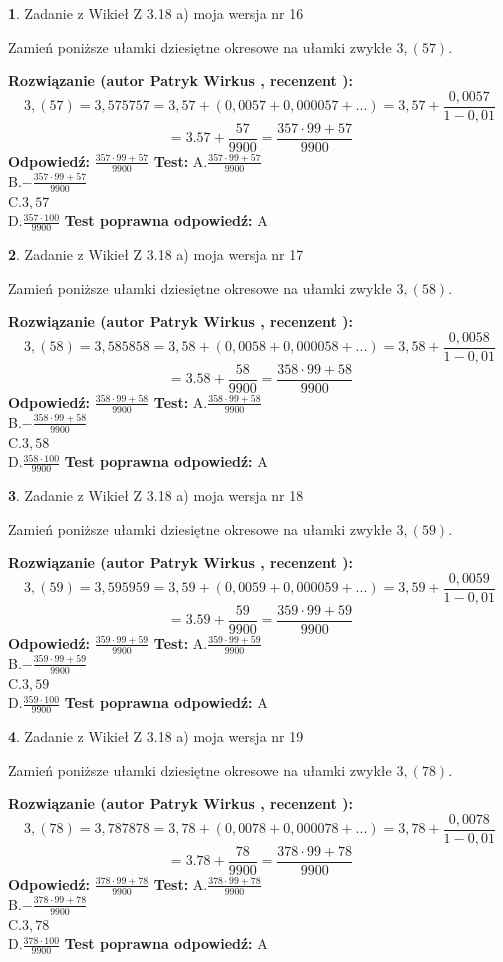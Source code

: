 \documentclass[12pt, a4paper]{article}
\theoremstyle{definition} %
\newtheorem{zad}{}
\newcommand{\zadStart}[1]{\begin{zad}#1\newline}
\newcommand{\zadStop}{\end{zad}}
\newcommand{\rozwStart}[2]{\noindent \textbf{Rozwiązanie (autor #1 , recenzent #2): }\newline}
\newcommand{\rozwStop}{\newline}
\newcommand{\odpStart}{\noindent \textbf{Odpowiedź:}\newline}
\newcommand{\odpStop}{\newline}
\newcommand{\testStart}{\noindent \textbf{Test:}\newline}
\newcommand{\testStop}{\newline}
\newcommand{\kluczStart}{\noindent \textbf{Test poprawna odpowiedź:}\newline}
\newcommand{\kluczStop}{\newline}
\begin{document}
\zadStart{Zadanie z Wikieł Z 3.18 a) moja wersja nr 16}

Zamień poniższe ułamki dziesiętne okresowe na ułamki zwykłe $3,(57)$.
\zadStop
\rozwStart{Patryk Wirkus}{}
$$3,(57)=3,575757=3,57+(0,0057+0,000057+...)=3,57+\frac{0,0057}{1-0,01}$$
$$=3.57+\frac{57}{9900}=\frac{357\cdot99+57}{9900}$$
\rozwStop
\odpStart
$\frac{357\cdot99+57}{9900}$
\odpStop
\testStart
A.$\frac{357\cdot99+57}{9900}$\\ B.$-\frac{357\cdot99+57}{9900}$\\ C.$3,57$\\ D.$\frac{357\cdot100}{9900}$
\testStop
\kluczStart
A
\kluczStop



\zadStart{Zadanie z Wikieł Z 3.18 a) moja wersja nr 17}

Zamień poniższe ułamki dziesiętne okresowe na ułamki zwykłe $3,(58)$.
\zadStop
\rozwStart{Patryk Wirkus}{}
$$3,(58)=3,585858=3,58+(0,0058+0,000058+...)=3,58+\frac{0,0058}{1-0,01}$$
$$=3.58+\frac{58}{9900}=\frac{358\cdot99+58}{9900}$$
\rozwStop
\odpStart
$\frac{358\cdot99+58}{9900}$
\odpStop
\testStart
A.$\frac{358\cdot99+58}{9900}$\\ B.$-\frac{358\cdot99+58}{9900}$\\ C.$3,58$\\ D.$\frac{358\cdot100}{9900}$
\testStop
\kluczStart
A
\kluczStop



\zadStart{Zadanie z Wikieł Z 3.18 a) moja wersja nr 18}

Zamień poniższe ułamki dziesiętne okresowe na ułamki zwykłe $3,(59)$.
\zadStop
\rozwStart{Patryk Wirkus}{}
$$3,(59)=3,595959=3,59+(0,0059+0,000059+...)=3,59+\frac{0,0059}{1-0,01}$$
$$=3.59+\frac{59}{9900}=\frac{359\cdot99+59}{9900}$$
\rozwStop
\odpStart
$\frac{359\cdot99+59}{9900}$
\odpStop
\testStart
A.$\frac{359\cdot99+59}{9900}$\\ B.$-\frac{359\cdot99+59}{9900}$\\ C.$3,59$\\ D.$\frac{359\cdot100}{9900}$
\testStop
\kluczStart
A
\kluczStop



\zadStart{Zadanie z Wikieł Z 3.18 a) moja wersja nr 19}

Zamień poniższe ułamki dziesiętne okresowe na ułamki zwykłe $3,(78)$.
\zadStop
\rozwStart{Patryk Wirkus}{}
$$3,(78)=3,787878=3,78+(0,0078+0,000078+...)=3,78+\frac{0,0078}{1-0,01}$$
$$=3.78+\frac{78}{9900}=\frac{378\cdot99+78}{9900}$$
\rozwStop
\odpStart
$\frac{378\cdot99+78}{9900}$
\odpStop
\testStart
A.$\frac{378\cdot99+78}{9900}$\\ B.$-\frac{378\cdot99+78}{9900}$\\ C.$3,78$\\ D.$\frac{378\cdot100}{9900}$
\testStop
\kluczStart
A
\kluczStop
\end{document}
